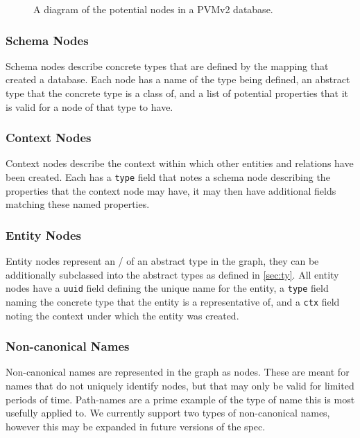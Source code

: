 \documentclass[12pt,twoside,a4paper]{article}
\newcommand{\field}[1]{\texttt{#1}}
\begin{document}
\begin{figure}[h]
\centering

\caption{A diagram of the potential nodes in a PVMv2 database.}
\label{fig:nodes}
\end{figure}

\subsubsection{Schema Nodes}
\label{sec:gs:node:schema}
Schema nodes describe concrete types that are defined by the mapping that created a database. Each node has a name of the type being defined, an abstract type that the concrete type is a class of, and a list of potential properties that it is valid for a node of that type to have.

\subsubsection{Context Nodes}
\label{sec:gs:node:context}
Context nodes describe the context within which other entities and relations have been created. Each has a \field{type} field that notes a schema node describing the properties that the context node may have, it may then have additional fields matching these named properties.

\subsubsection{Entity Nodes}
\label{sec:gs:node:entity}
Entity nodes represent an \Entity/ of an abstract type in the graph, they can be additionally subclassed into the abstract types as defined in \autoref{sec:ty}. All entity nodes have a \field{uuid} field defining the unique name for the entity, a \field{type} field naming the concrete type that the entity is a representative of, and a \field{ctx} field noting the context under which the entity was created.

\subsubsection{Non-canonical Names}
\label{sec:gs:node:name}
Non-canonical names are represented in the graph as nodes. These are meant for names that do not uniquely identify nodes, but that may only be valid for limited periods of time. Path-names are a prime example of the type of name this is most usefully applied to. We currently support two types of non-canonical names, however this may be expanded in future versions of the spec.
\end{document}
